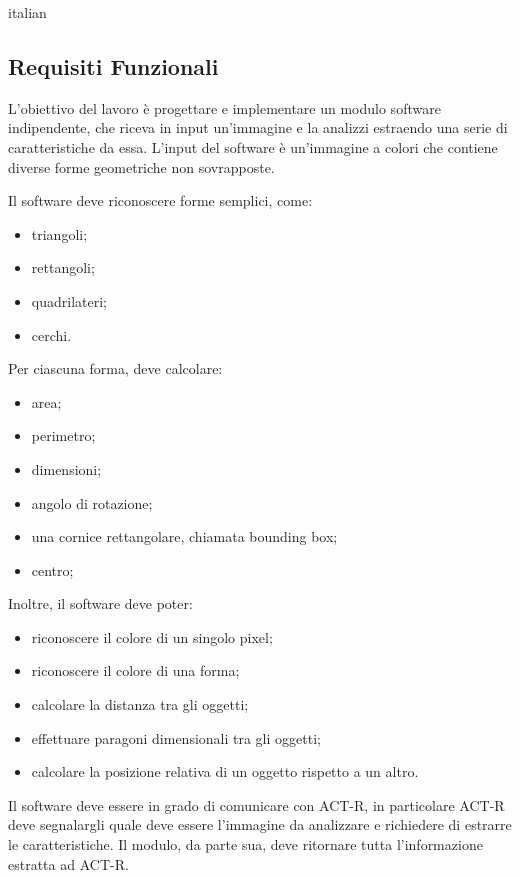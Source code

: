 \begin{otherlanguage*}{italian}
		\subsection*{Requisiti Funzionali}
			L'obiettivo del lavoro è progettare e implementare un modulo software indipendente, che riceva in input un'immagine e la analizzi estraendo una serie di caratteristiche da essa.
			L'input del software è un'immagine a colori che contiene diverse forme geometriche non sovrapposte. 

			Il software deve riconoscere forme semplici, come:
			\begin{itemize}
	    		\item triangoli;
				\item rettangoli;
				\item quadrilateri;
				\item cerchi.
			\end{itemize}

			Per ciascuna forma, deve calcolare:
			\begin{itemize}
				\item area;
				\item perimetro;
				\item dimensioni;
				\item angolo di rotazione;
				\item una cornice rettangolare, chiamata bounding box;
				\item centro;
			\end{itemize}	
		
			Inoltre, il software deve poter:
			\begin{itemize}
				\item riconoscere il colore di un singolo pixel;
				\item riconoscere il colore di una forma;
				\item calcolare la distanza tra gli oggetti;			
				\item effettuare paragoni dimensionali tra gli oggetti;
				\item calcolare la posizione relativa di un oggetto rispetto a un altro.
			\end{itemize}

			Il software deve essere in grado di comunicare con \mbox{ACT-R}, in particolare \mbox{ACT-R} deve segnalargli quale deve essere l'immagine da analizzare e richiedere di estrarre le caratteristiche.
			Il modulo, da parte sua, deve ritornare tutta l'informazione estratta ad \mbox{ACT-R}.
		

\end{otherlanguage*}
